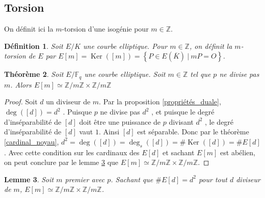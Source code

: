 \documentclass{article}
\theoremstyle{plain}%
\newtheorem{thm}{Théorème}[section]
\newtheorem{deff}[thm]{Définition}
\newtheorem{lem}[thm]{Lemme}
\theoremstyle{definition}%
\newcommand{\F}{\mathbb{F}}
\newcommand{\Z}{\mathbb{Z}}
\DeclareMathOperator{\Ker}{Ker}
\begin{document}
\subsection{Torsion}

On définit ici la $m$-torsion d'une isogénie pour $m\in\Z$.

\begin{deff}
  Soit $E/K$ une courbe elliptique. Pour $m\in\Z$, on définit la $m$-torsion de $E$ par $ E[m] = \Ker([m])= \left\{ P\in E(\overline{K}) \ \vert\  mP = O \right\}$.
\end{deff}

\begin{thm}
  \label{structure_torsion}
  Soit $E/\F_q$ une courbe elliptique. Soit $m\in \Z$ tel que $p$ ne divise pas $m$. Alors $E[m] \simeq {\Z}/{m\Z} \times  {\Z}/{m\Z}$
\end{thm}

\begin{proof}
Soit $d$ un diviseur de $m$. 
Par la proposition \ref{propriétés_duale}, $\deg([d]) = d^2$ . Puisque $p$ ne divise pas $d^2$ , et puisque le degré d'inséparabilité de $[d]$ doit être une puissance de $p$ divisant $d^2$ , le degré d'inséparabilité de $[d]$ vaut $1$. Ainsi $[d]$ est séparable. Donc par le théorème \ref{cardinal_noyau}, $d^2 = \deg([d]) = \deg_s([d]) = \#\Ker([d]) = \#E[d]$. 
Avec cette condition sur les cardinaux des $E[d]$ et sachant $E[m]$ est abélien, on peut conclure par le lemme \ref{groupes_abéliens} que $E[m] \simeq {\Z}/{m\Z} \times  {\Z}/{m\Z}$.
\end{proof}

\begin{lem}
  \label{groupes_abéliens}
  Soit $m$ premier avec $p$. Sachant que $\#E[d]=d^2$ pour tout $d$ diviseur de $m$, $E[m] \simeq {\Z}/{m\Z} \times  {\Z}/{m\Z}$. 
\end{lem}
\end{document}
